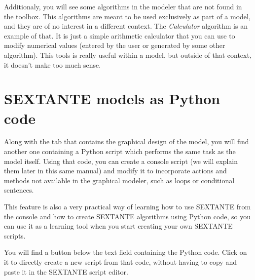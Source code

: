 Additionaly, you will see some algorithms in the modeler that are not found in the toolbox. This algorithms are meant to be used exclusively as part of a model, and they are of no interest in a different context. The \emph{Calculator} algorithm is an example of that. It is just a simple arithmetic calculator that you can use to modify numerical values (entered by the user or generated by some other algorithm). This tools is really useful within a model, but outside of that context, it doesn't make too much sense.


\section{SEXTANTE models as Python code}

Along with the tab that contains the graphical design of the model, you will find another one containing a Python script which performs the same task as the model itself. Using that code, you can create a console script (we will explain them later in this same manual) and modify it to incorporate actions and methods not available in the graphical modeler, such as loops or conditional sentences.

This feature is also a very practical way of learning how to use SEXTANTE from the console and how to create SEXTANTE algorithms using Python code, so you can use it as a learning tool when you start creating your own SEXTANTE scripts.

You will find a button below the text field containing the Python code. Click on it to directly create a new script from that code, without having to copy and paste it in the SEXTANTE script editor.